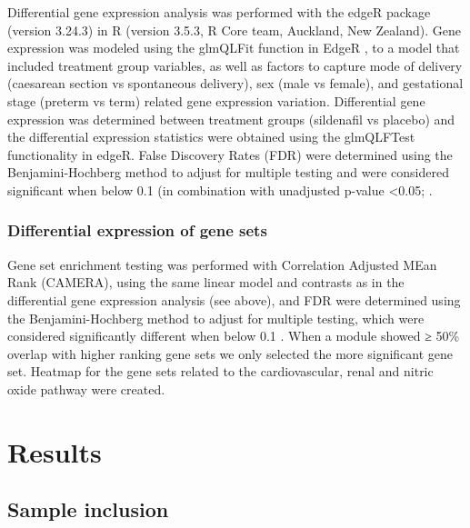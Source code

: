\documentclass[authordate, empirical]{jote-new-article}
\begin{document}
Differential gene expression analysis was performed with the edgeR package (version 3.24.3) in R (version 3.5.3, R Core team, Auckland, New Zealand). Gene expression was modeled using the glmQLFit function in EdgeR \parencites{Robinson2010}, to a model that included treatment group variables, as well as factors to capture mode of delivery (caesarean section vs spontaneous delivery), sex (male vs female), and gestational stage (preterm vs term) related gene expression variation. Differential gene expression was determined between treatment groups (sildenafil vs placebo) and the differential expression statistics were obtained using the glmQLFTest functionality in edgeR. False Discovery Rates (FDR) were determined using the Benjamini-Hochberg method to adjust for multiple testing and were considered significant when below 0.1 (in combination with unadjusted p-value <0.05; \parencites{Benjamini1995}.







\subsubsection{Differential expression of gene sets}



Gene set enrichment testing was performed with Correlation Adjusted MEan Rank (CAMERA), using the same linear model and contrasts as in the differential gene expression analysis (see above), and FDR were determined using the Benjamini-Hochberg method to adjust for multiple testing, which were considered significantly different when below 0.1 \parencites{Benjamini1995}. When a module showed ≥ 50\% overlap with higher ranking gene sets we only selected the more significant gene set. Heatmap for the gene sets related to the cardiovascular, renal and nitric oxide pathway were created.







\section{Results}







\subsection{Sample inclusion}
\end{document}
